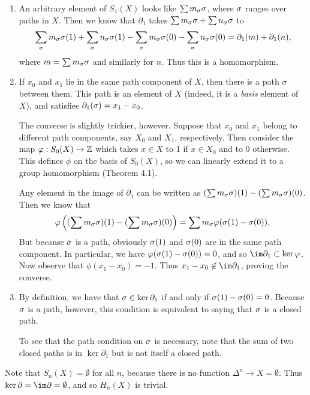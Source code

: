 \documentclass[../../solutions.tex]{subfiles}
\begin{document}
\begin{exercise} \leavevmode
\begin{enumerate}
\item An arbitrary element of $S_1(X)$ looks like $\sum m_\sigma\sigma$, where $\sigma$ ranges over paths in $X$. 
Then we know that $\partial_1$ takes $\sum m_\sigma\sigma+\sum n_\sigma\sigma$ to \[\sum_\sigma m_\sigma\sigma(1)+\sum_\sigma n_\sigma\sigma(1)-\sum_\sigma m_\sigma\sigma(0)-\sum_\sigma n_\sigma\sigma(0)=\partial_1(m)+\partial_1(n),\] where $m=\sum m_\sigma\sigma$ and similarly for $n$. 
Thus this is a homomorphism. 

\item If $x_0$ and $x_1$ lie in the same path component of $X$, then there is a path $\sigma$ between them. 
This path is an element of $X$ (indeed, it is a \textit{basis} element of $X$), and satisfies $\partial_1(\sigma)=x_1-x_0$. 

The converse is slightly trickier, however. 
Suppose that $x_0$ and $x_1$ belong to different path components, say $X_0$ and $X_1$, respectively. 
Then consider the map $\varphi:S_0(X)\to\mathbb{Z}$ which takes $x\in X$ to 1 if $x\in X_0$ and to 0 otherwise. 
This defines $\phi$ on the basis of $S_0(X)$, so we can linearly extend it to a group homomorphism (Theorem 4.1). 

Any element in the image of $\partial_1$ can be written as $(\sum m_\sigma\sigma)(1)-(\sum m_\sigma\sigma)(0)$. 
Then we know that \[\varphi\left((\sum m_\sigma\sigma)(1)-(\sum m_\sigma\sigma)(0)\right)=\sum m_\sigma\varphi(\sigma(1)-\sigma(0)).\] 
But because $\sigma$ is a path, obviously $\sigma(1)$ and $\sigma(0)$ are in the same path component. 
In particular, we have $\varphi(\sigma(1)-\sigma(0))=0$, and so $\im\partial_1\subset\ker\phi$. 
Now observe that $\phi(x_1-x_0)=-1$. 
Thus $x_1-x_0\not\in\im\partial_1$, proving the converse. 

\item By definition, we have that $\sigma\in\ker\partial_1$ if and only if $\sigma(1)-\sigma(0)=0$. 
Because $\sigma$ is a path, however, this condition is equivalent to saying that $\sigma$ is a closed path. 

To see that the path condition on $\sigma$ is necessary, note that the sum of two closed paths is in $\ker\partial_1$ but is not itself a closed path. 
\end{enumerate}
\end{exercise}

\begin{exercise} \leavevmode
Note that $S_n(X)=\emptyset$ for all $n$, because there is no function $\Delta^n\to X=\emptyset$. 
Thus $\ker\partial=\im\partial=\emptyset$, and so $H_n(X)$ is trivial.
\end{exercise}
\end{document}
